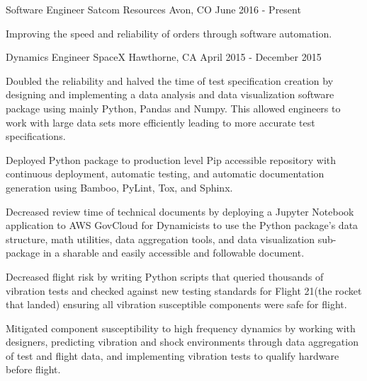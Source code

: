 

\begin{cventries}

  \cventry
    {Software Engineer} %
    {Satcom Resources} %
    {Avon, CO} %
    {June 2016 - Present} %
    {
      \begin{cvitems} %
        \item {Improving the speed and reliability of orders through software automation.}
      \end{cvitems}
    }

  \cventry
    {Dynamics Engineer} %
    {SpaceX} %
    {Hawthorne, CA} %
    {April 2015 - December 2015} %
    {
      \begin{cvitems} %
        \item {Doubled the reliability and halved the time of test specification creation by designing and implementing a data analysis and data visualization software package using mainly Python, Pandas and Numpy. This allowed engineers to work with large data sets more efficiently leading to more accurate test specifications.}
        \item {Deployed Python package to production level Pip accessible repository with continuous deployment, automatic testing, and automatic documentation generation using Bamboo, PyLint, Tox, and Sphinx.}
        \item {Decreased review time of technical documents by deploying a Jupyter Notebook application to AWS GovCloud for Dynamicists to use the Python package’s data structure, math utilities, data aggregation tools, and data visualization sub-package in a sharable and easily accessible and followable document.}
        \item {Decreased flight risk by writing Python scripts that queried thousands of vibration tests and checked against new testing standards for Flight 21(the rocket that landed) ensuring all vibration susceptible components were safe for flight.}
        \item {Mitigated component susceptibility to high frequency dynamics by working with designers, predicting vibration and shock environments through data aggregation of test and flight data, and implementing vibration tests to qualify hardware before flight.}
      \end{cvitems}
    }


\end{cventries}
